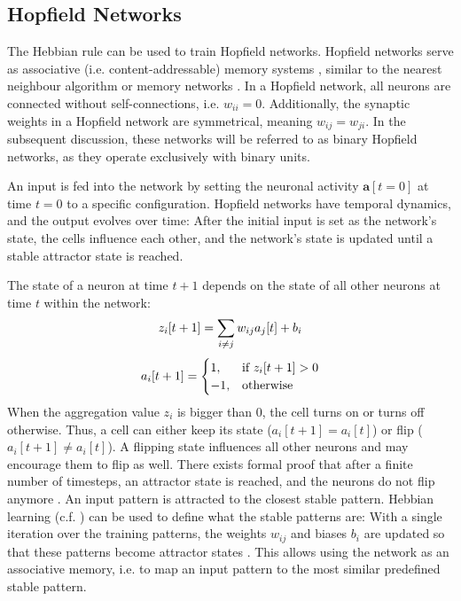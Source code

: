 \subsection{Hopfield Networks}
The Hebbian rule can be used to train Hopfield networks.
Hopfield networks serve as associative (i.e. content-addressable) memory systems , similar to the nearest neighbour algorithm  or memory networks \cite{weston_memory_2015}.
In a Hopfield network, all neurons are connected without self-connections, i.e. $w_{ii}=0$.
Additionally, the synaptic weights in a Hopfield network are symmetrical, meaning \(w_{ij} = w_{ji}\).
In the subsequent discussion, these networks will be referred to as binary Hopfield networks, as they operate exclusively with binary units.

An input is fed into the network by setting the neuronal activity $\boldsymbol{a}[t=0]$ at time $t=0$ to a specific configuration.
Hopfield networks have temporal dynamics, and the output evolves over time: After the initial input is set as the network's state, the cells influence each other, and the network's state is updated until a stable attractor state is reached.

The state of a neuron at time $t+1$ depends on the state of all other neurons at time $t$ within the network:
%
\begin{align}\eqlbl{hf_1}
	z_i[t+1] = \sum_{i \neq j} w_{ij} a_j[t] + b_i
\end{align}
%
\begin{align}\eqlbl{hf_2}
	a_i[t+1] = \begin{cases}
      		1, & \text{if } z_i[t+1] > 0 \\
      		-1, & \text{otherwise}
    	\end{cases}
\end{align}
%
When the aggregation value $z_i$ is bigger than $0$, the cell turns on or turns off otherwise.
Thus, a cell can either keep its state ($a_i[t+1] = a_i[t]$) or flip ($a_i[t+1] \neq a_i[t]$).
A flipping state influences all other neurons and may encourage them to flip as well.
There exists formal proof that after a finite number of timesteps, an attractor state is reached, and the neurons do not flip anymore .
An input pattern is attracted to the closest stable pattern.
Hebbian learning (c.f. ) can be used to define what the stable patterns are:
With a single iteration over the training patterns, the weights $w_{ij}$ and biases $b_i$ are updated so that these patterns become attractor states .
This allows using the network as an associative memory, i.e. to map an input pattern to the most similar predefined stable pattern.

